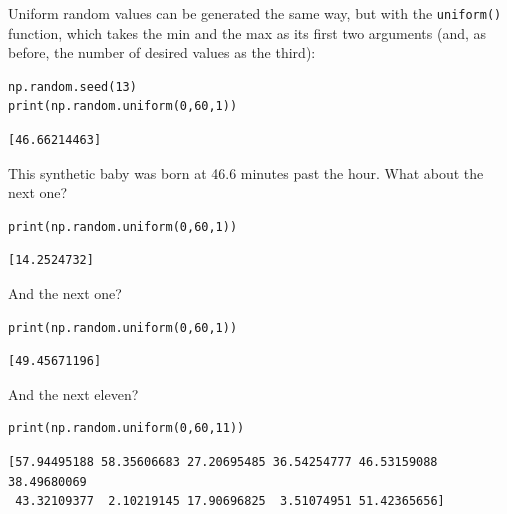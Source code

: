 
Uniform random values can be generated the same way, but with the
\texttt{uniform()} function, which takes the min and the max as its first two
arguments (and, as before, the number of desired values as the third):

\begin{Verbatim}[fontsize=\small,samepage=true,frame=single,framesep=3mm]
np.random.seed(13)
print(np.random.uniform(0,60,1))
\end{Verbatim}
\vspace{-.2in}

\begin{Verbatim}[fontsize=\small,samepage=true,frame=leftline,framesep=5mm,framerule=1mm]
[46.66214463]
\end{Verbatim}

This synthetic baby was born at 46.6 minutes past the hour. What about the next
one?


\begin{Verbatim}[fontsize=\small,samepage=true,frame=single,framesep=3mm]
print(np.random.uniform(0,60,1))
\end{Verbatim}
\vspace{-.2in}

\begin{Verbatim}[fontsize=\small,samepage=true,frame=leftline,framesep=5mm,framerule=1mm]
[14.2524732]
\end{Verbatim}

And the next one?

\begin{Verbatim}[fontsize=\small,samepage=true,frame=single,framesep=3mm]
print(np.random.uniform(0,60,1))
\end{Verbatim}
\vspace{-.2in}

\begin{Verbatim}[fontsize=\small,samepage=true,frame=leftline,framesep=5mm,framerule=1mm]
[49.45671196]
\end{Verbatim}

And the next eleven?

\begin{Verbatim}[fontsize=\small,samepage=true,frame=single,framesep=3mm]
print(np.random.uniform(0,60,11))
\end{Verbatim}
\vspace{-.2in}

\begin{Verbatim}[fontsize=\small,samepage=true,frame=leftline,framesep=5mm,framerule=1mm]
[57.94495188 58.35606683 27.20695485 36.54254777 46.53159088 38.49680069
 43.32109377  2.10219145 17.90696825  3.51074951 51.42365656]
\end{Verbatim}

